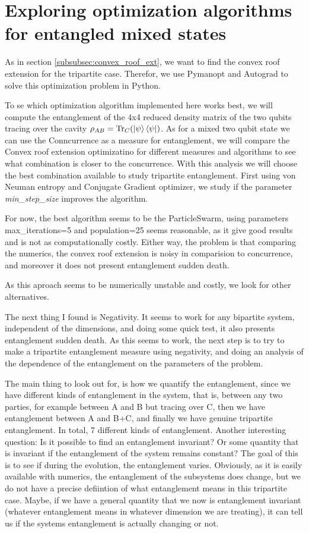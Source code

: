 \section{Exploring optimization algorithms for entangled mixed states}

As in section \ref{subsubsec:convex_roof_ext}, we want to find the convex roof extension for the tripartite case. Therefor, we use Pymanopt and Autograd to solve this optimization problem in Python. 

To se which optimization algorithm implemented here works best, we will compute the entanglement of the 4x4 reduced density matrix of the two qubits tracing over the cavity $\rho_{AB}=\text{Tr}_C(\ket{\psi}\bra{\psi})$. As for a mixed two qubit state we can use the Conncurrence as a measure for entanglement, we will compare the Convex roof extension optimizatino for different measures and algorithms to see what combination is closer to the concurrence. With this analysis we will choose the best combination available to study tripartite entanglement. 
First using von Neuman entropy and Conjugate Gradient optimizer, we study if the parameter \textit{min\_step\_size} improves the algorithm. 


For now, the best algorithm seems to be the ParticleSwarm, using parameters max\_iterations=5 and population=25 seems reasonable, as it give good results and is not as computationally costly. Either way, the problem is that comparing the numerics, the convex roof extension is noisy in comparision to concurrence, and moreover it does not present entanglement sudden death. 

As this aproach seems to be numerically unstable and costly, we look for other alternatives. 

The next thing I found is Negativity. It seems to work for any bipartite system, independent of the dimensions, and doing some quick test, it also presents entanglement sudden death. As this seems to work, the next step is to try to make a tripartite entanglement measure using negativity, and doing an analysis of the dependence of the entanglement on the parameters of the problem. 

The main thing to look out for, is how we quantify the entanglement, since we have different kinds of entanglement in the system, that is, between any two parties, for example between A and B but tracing over C, then we have entanglement between A and B+C, and finally we have genuine tripartite entanglement. In total, 7 different kinds of entanglement. 
Another interesting question: Is it possible to find an entanglement invariant? Or some quantity that is invariant if the entanglement of the system remains constant? The goal of this is to see if during the evolution, the entanglement varies. Obviously, as it is easily available with numerics, the entanglement of the subsystems does change, but we do not have a precise defiintion of what entanglement means in this tripartite case. Maybe, if we have a general quantity that we now is entanglement invariant (whatever entanglement means in whatever dimension we are treating), it can tell us if the systems entanglement is actually changing or not.

